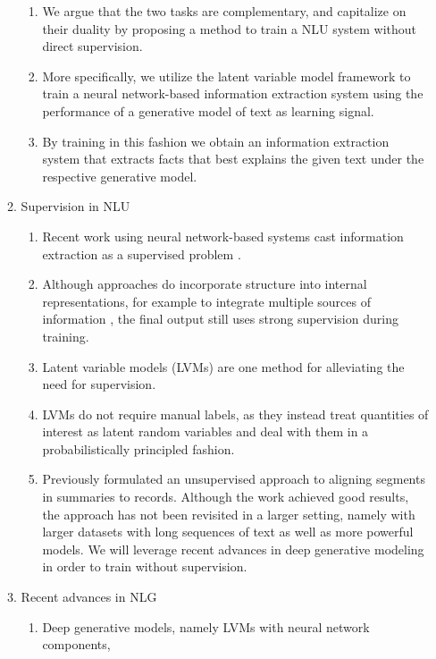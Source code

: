 \documentclass[11pt]{article}
\begin{document}
\begin{enumerate}
\begin{enumerate}
\begin{enumerate}
        \item We argue that the two tasks are complementary,
            and capitalize on their duality by proposing a method to train a NLU system
            without direct supervision.
        \item More specifically, we utilize the latent variable model framework to train a 
            neural network-based information
            extraction system using the performance of a generative model of text as learning signal.
        \item By training in this fashion we obtain an information extraction system
            that extracts facts that best explains the given text under the respective generative model.
        \end{enumerate}
    \item Supervision in NLU
        \begin{enumerate}
        \item Recent work using neural network-based systems cast information extraction
        as a supervised problem
        \citep{wiseman2017d2t,dossantos2015classification}.
        \item Although approaches do incorporate structure into internal representations,
        for example to integrate multiple sources of information \citep{weissenborn17},
        the final output still uses strong supervision during training.
        \item Latent variable models (LVMs) are one method for alleviating the need for supervision.
        \item LVMs do not require manual labels, as they instead treat quantities of interest
            as latent random variables and deal with them in a probabilistically principled 
            fashion.
        \item Previously \citet{liang2009semalign} formulated an unsupervised approach
            to aligning segments in summaries to records. Although the work achieved
            good results, the approach has not been revisited in a larger setting,
            namely with larger datasets with long sequences of text as well as more powerful
            models.
            We will leverage recent advances in deep generative modeling in order to
            train without supervision.
        \end{enumerate}
    \item Recent advances in NLG
        \begin{enumerate}
        \item Deep generative models, namely LVMs with neural network components,

\end{enumerate}
\end{enumerate}
\end{enumerate}
\end{document}
